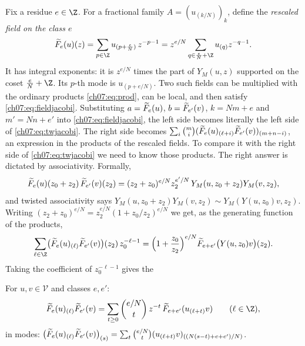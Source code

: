 Fix a residue $e\in\Z$. For a fractional family $A = (u_{(k/N)})_{k}$, define the
\emph{rescaled field on the class $e$}
\begin{equation}\label{ch07:eq:resc}
  \chsevenF_e(u)(z) = \sum_{p\in\Z} u_{(p+\frac eN)}\,z^{-p-1}
  = z^{e/N}\sum_{q\in \frac eN+\Z}u_{(q)}z^{-q-1}.
\end{equation}
It has integral exponents: it is $z^{e/N}$ times the part of $Y_M(u,z)$ supported on the coset
$\frac eN+\Z$. Its $p$-th mode is $u_{(p+e/N)}$. Two such fields can be multiplied with the
ordinary products \eqref{ch07:eq:prod}, can be local, and then satisfy \eqref{ch07:eq:fieldjacobi}.
Substituting $a = \widetilde{F}_e(u)$, $b=\widetilde{F}_{e'}(v)$, $k = Nm+e$ and $m' = Nn+e'$ into
\eqref{ch07:eq:fieldjacobi}, the left side becomes literally the left side of
\eqref{ch07:eq:twjacobi}. The right side becomes $\sum_i\binom mi
(\widetilde{F}_e(u)_{(\ell+i)}\widetilde{F}_{e'}(v))_{(m+n-i)}$, an expression in the products of the
rescaled fields. To compare it with the right side of \eqref{ch07:eq:twjacobi} we need to know
those products. The right answer is dictated by associativity. Formally,
\begin{equation*}
  \widetilde{F}_e(u)(z_0+z_2)\,\widetilde{F}_{e'}(v)(z_2) = (z_2+z_0)^{e/N}z_2^{e'/N}\,Y_M(u,z_0+z_2)
  Y_M(v,z_2),
\end{equation*}
and twisted associativity says $Y_M(u,z_0+z_2)Y_M(v,z_2)\sim Y_M(Y(u,z_0)v,z_2)$. Writing
$(z_2+z_0)^{e/N} = z_2^{e/N}(1+z_0/z_2)^{e/N}$ we get, as the generating function of the
products,
\begin{equation}\label{ch07:eq:pfgen}
  \sum_{\ell\in\Z}\bigl(\chsevenF_e(u)_{(\ell)}\chsevenF_{e'}(v)\bigr)(z_2)\,z_0^{-\ell-1}
  = \Bigl(1+\frac{z_0}{z_2}\Bigr)^{e/N}\chsevenF_{e+e'}\bigl(Y(u,z_0)v\bigr)(z_2).
\end{equation}
Taking the coefficient of $z_0^{-\ell-1}$ gives the

\begin{definition}\label{ch07:def:pf}
For $u,v\in\mathcal V$ and classes $e,e'$:
\begin{equation}\label{ch07:eq:pf}
  \chsevenF_e(u)_{(\ell)}\chsevenF_{e'}(v) = \sum_{t\ge0}\binom{e/N}{t}\,z^{-t}\,
  \chsevenF_{e+e'}(u_{(\ell+t)}v)\qquad(\ell\in\Z),
\end{equation}
in modes: $\bigl(\widetilde{F}_e(u)_{(\ell)}\widetilde{F}_{e'}(v)\bigr)_{(s)} = \sum_t\binom{e/N}{t}
(u_{(\ell+t)}v)_{((N(s-t)+e+e')/N)}$.
\end{definition}

